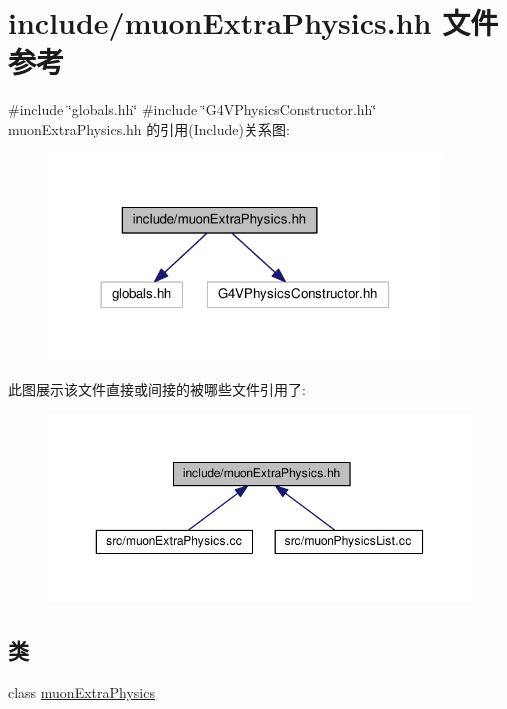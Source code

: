 \hypertarget{muonExtraPhysics_8hh}{}\section{include/muon\+Extra\+Physics.hh 文件参考}
\label{muonExtraPhysics_8hh}
{\ttfamily \#include \char`\"{}globals.\+hh\char`\"{}}\newline
{\ttfamily \#include \char`\"{}G4\+V\+Physics\+Constructor.\+hh\char`\"{}}\newline
muon\+Extra\+Physics.\+hh 的引用(Include)关系图\+:\nopagebreak
\begin{figure}[H]
\begin{center}
\leavevmode
\includegraphics[width=296pt]{muonExtraPhysics_8hh__incl}
\end{center}
\end{figure}
此图展示该文件直接或间接的被哪些文件引用了\+:\nopagebreak
\begin{figure}[H]
\begin{center}
\leavevmode
\includegraphics[width=350pt]{muonExtraPhysics_8hh__dep__incl}
\end{center}
\end{figure}
\subsection*{类}
\begin{DoxyCompactItemize}
\item 
class \hyperlink{classmuonExtraPhysics}{muon\+Extra\+Physics}
\end{DoxyCompactItemize}
